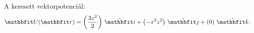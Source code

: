 \documentclass[exercise]{math-standalone}
\begin{document}
\begin{exercise}
{\begin{enumerate}[a)]
\begin{itemize}
                    A keresett vektorpotenciál:
                    \[
                      \rvec U(\rvec r)
                      = \ijk{\frac{3z^2}{2}}{-x^3 z^2}{0}
                      \text.
                    \]
            \end{itemize}
    \end{enumerate}
  }
\end{exercise}
\end{document}
